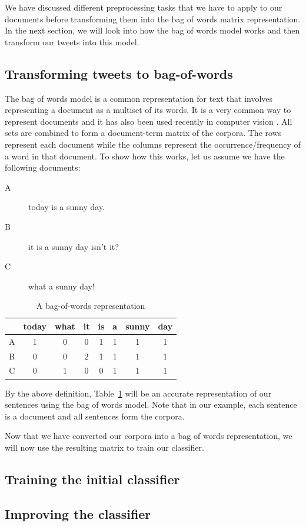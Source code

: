 We have discussed different preprocessing tasks that we have to apply to our documents before
transforming them into the bag of words matrix representation. In the next section, we will look
into how the bag of words model works and then transform our tweets into this model.


\subsection{Transforming tweets to bag-of-words}
The bag of words model is a common representation for text that involves representing a document as
a multiset of its words. It is a very common way to represent documents and it has also been used
recently in computer vision \citep{sivic2009efficient}. All sets are combined to form a
document-term matrix of the corpora. The rows represent each document while the columns represent
the occurrence/frequency of a word in that document. To show how this works, let us assume we have
the following documents:
\begin{description}
  \item[A] today is a sunny day.
  \item[B] it is a sunny day isn't it?
  \item[C] what a sunny day!
\end{description}

\begin{table}
  \begin{center}
    \begin{tabular}{|c|c c c c c c c|}
      \hline
      & today & what & it & is & a & sunny & day \\
      \hline
      A & 1 & 0 & 0 & 1 & 1 & 1 & 1 \\
      B & 0 & 0 & 2 & 1 & 1 & 1 & 1 \\
      C & 0 & 1 & 0 & 0 & 1 & 1 & 1 \\
      \hline
    \end{tabular}
    \caption{A bag-of-words representation}
    \label{table:document-term_matrix}
  \end{center}
\end{table}

By the above definition, Table~\ref{table:document-term_matrix} will be an accurate representation
of our sentences using the bag of words model. Note that in our example, each sentence is a document
and all sentences form the corpora.

Now that we have converted our corpora into a bag of words representation, we will now use the
resulting matrix to train our classifier.
\subsection{Training the initial classifier}


\subsection{Improving the classifier}

